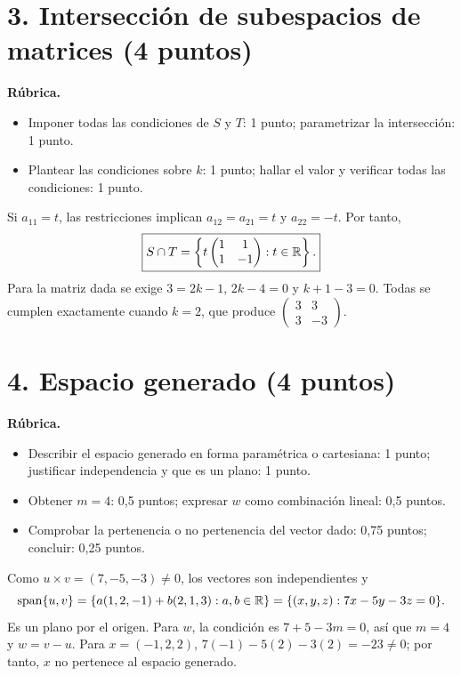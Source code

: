 \documentclass[10pt,a4]{examenEPN0}
\begin{document}
\section*{3. Intersección de subespacios de matrices (4 puntos)}
\noindent\textbf{Rúbrica.}
\begin{itemize}[itemsep=2pt]
    \item Imponer todas las condiciones de $S$ y $T$: 1 punto; parametrizar la intersección: 1 punto.
    \item Plantear las condiciones sobre $k$: 1 punto; hallar el valor y verificar todas las condiciones: 1 punto.
\end{itemize}
Si $a_{11}=t$, las restricciones implican $a_{12}=a_{21}=t$ y
$a_{22}=-t$. Por tanto,
\[
    \boxed{S\cap T=\left\{t\begin{pmatrix}1&1\\1&-1\end{pmatrix}:t\in\mathbb{R}\right\}.}
\]
Para la matriz dada se exige $3=2k-1$, $2k-4=0$ y $k+1-3=0$.
Todas se cumplen exactamente cuando $k=2$, que produce
$\begin{pmatrix}3&3\\3&-3\end{pmatrix}$.

\section*{4. Espacio generado (4 puntos)}
\noindent\textbf{Rúbrica.}
\begin{itemize}[itemsep=2pt]
    \item Describir el espacio generado en forma paramétrica o cartesiana: 1 punto; justificar independencia y que es un plano: 1 punto.
    \item Obtener $m=4$: 0,5 puntos; expresar $w$ como combinación lineal: 0,5 puntos.
    \item Comprobar la pertenencia o no pertenencia del vector dado: 0,75 puntos; concluir: 0,25 puntos.
\end{itemize}
Como $u\times v=(7,-5,-3)\ne0$, los vectores son independientes y
\[
    \operatorname{span}\{u,v\}=\{a(1,2,-1)+b(2,1,3):a,b\in\mathbb{R}\}
    =\{(x,y,z):7x-5y-3z=0\}.
\]
Es un plano por el origen. Para $w$, la condición es
$7+5-3m=0$, así que $m=4$ y $w=v-u$.
Para $x=(-1,2,2)$, $7(-1)-5(2)-3(2)=-23\ne0$;
por tanto, $x$ no pertenece al espacio generado.
\end{document}
